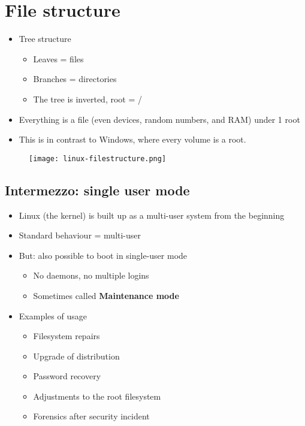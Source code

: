 \documentclass{article}
\begin{document}
\section{File structure}

\begin{itemize}
    \item Tree structure
    \begin{itemize}
        \item Leaves = files
        \item Branches = directories
        \item The tree is inverted, root = /
    \end{itemize}
    \item Everything is a file (even devices, random numbers, and RAM) under 1 root
    \item This is in contrast to Windows, where every volume is a root.
\end{itemize}

\begin{figure}[H]
    \centering
    \texttt{[image: linux-filestructure.png]}
\end{figure}



\subsection{Intermezzo: single user mode}

\begin{itemize}
    \item Linux (the kernel) is built up as a multi-user system from the beginning
    \item Standard behaviour = multi-user
    \item But: also possible to boot in single-user mode
    \begin{itemize}
        \item No daemons, no multiple logins
        \item Sometimes called \textbf{Maintenance mode}
    \end{itemize}
    \item Examples of usage
    \begin{itemize}
        \item Filesystem repairs
        \item Upgrade of distribution
        \item Password recovery
        \item Adjustments to the root filesystem
        \item Forensics after security incident
    \end{itemize}
\end{itemize}
\end{document}
